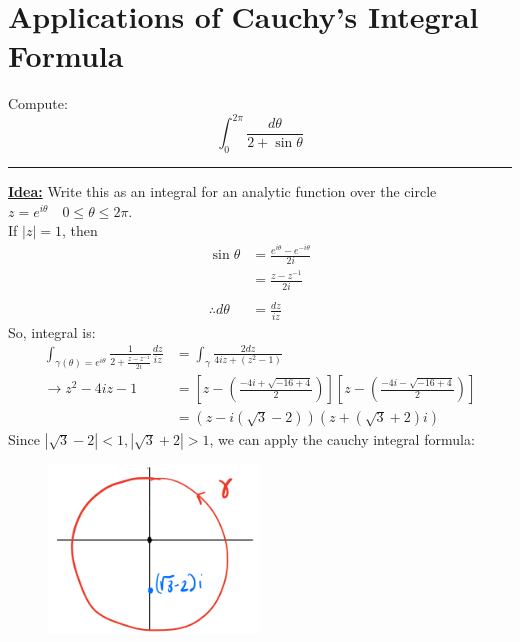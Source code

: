 \section{Applications of Cauchy's Integral Formula}

\begin{example}
    Compute:
    $$\int_{0}^{2\pi} \frac{d\theta}{2 + \sin \theta}$$

    \hrule
    \vspace{1em}
    \textbf{\underline{Idea:}} Write this as an integral for an analytic function over the circle $z = e^{i\theta} \quad 0 \leq \theta \leq 2\pi$. \\
    If $|z| = 1$, then
    \begin{align*}
        \sin \theta        & = \frac{e^{i\theta} - e^{-i\theta}}{2i} \\
                           & = \frac{z - z^{-1}}{2i}                 \\ \\
        \therefore d\theta & = \frac{dz}{iz}
    \end{align*}
    So, integral is:
    \begin{align*}
        \int_{\gamma(\theta) = e^{i\theta}} \frac{1}{2 + \frac{z - z^{-1}}{2i}} \frac{dz}{iz} & = \int_{\gamma} \frac{2dz}{4iz + (z^2 - 1)}                                                                                \\
        \rightarrow z^2 - 4iz - 1                                                             & = \left[z - \left(\frac{-4i + \sqrt{-16 + 4}}{2}\right)\right]\left[z - \left(\frac{-4i - \sqrt{-16 + 4}}{2}\right)\right] \\
                                                                                              & = (z - i(\sqrt{3}-2))(z + (\sqrt{3} + 2)i)
    \end{align*}
    Since $|\sqrt{3} - 2| < 1, |\sqrt{3} + 2| > 1$, we can apply the cauchy integral formula:
    \begin{figure}[H]
        \centering
        \includegraphics[width=0.5\textwidth]{LECTURE_7/example.png}

\end{figure}
\end{example}
